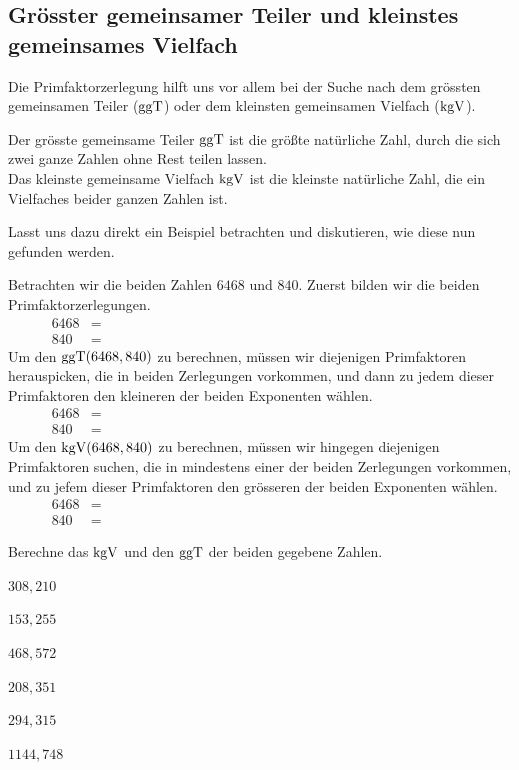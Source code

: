 \documentclass[11pt,oneside]{article}
\begin{document}
\subsection{Grösster gemeinsamer Teiler und kleinstes gemeinsames Vielfach}
    Die Primfaktorzerlegung hilft uns vor allem bei der Suche nach dem grössten gemeinsamen Teiler ($\operatorname{ggT}$) oder dem kleinsten gemeinsamen Vielfach ($\operatorname{kgV}$).
    \begin{definition}
        Der grösste gemeinsame Teiler $\operatorname{ggT}$ ist die größte natürliche Zahl, durch die sich zwei ganze Zahlen ohne Rest teilen lassen.\\
        Das kleinste gemeinsame Vielfach $\operatorname{kgV}$ ist die kleinste natürliche Zahl, die ein Vielfaches beider ganzen Zahlen ist.
    \end{definition}
    Lasst uns dazu direkt ein Beispiel betrachten und diskutieren, wie diese nun gefunden werden.
    \begin{beispiel}
        Betrachten wir die beiden Zahlen $6468$ und $840$. Zuerst bilden wir die beiden Primfaktorzerlegungen.
        \begin{align*}
            6468&=\hspace{11cm}\\
            840&=
        \end{align*}
        Um den $\operatorname{ggT}(6468,840)$ zu berechnen, müssen wir diejenigen Primfaktoren herauspicken, die in beiden Zerlegungen vorkommen, und dann zu jedem dieser Primfaktoren den kleineren der beiden Exponenten wählen.
        \begin{align*}
            6468&=\hspace{11cm}\\
            840&=
        \end{align*}
        Um den $\operatorname{kgV}(6468,840)$ zu berechnen, müssen wir hingegen diejenigen Primfaktoren suchen, die in mindestens einer der beiden Zerlegungen vorkommen, und zu jefem dieser Primfaktoren den grösseren der beiden Exponenten wählen.
        \begin{align*}
            6468&=\hspace{11cm}\\
            840&=
        \end{align*}
    \end{beispiel}
    \begin{aufgabe}
        Berechne das $\operatorname{kgV}$ und den $\operatorname{ggT}$ der beiden gegebene Zahlen.
        \begin{enumcols}[3]
            \item $308,210$
            \item $153,255$
            \item $468,572$
            \item $208,351$
            \item $294,315$
            \item $1144,748$
        \end{enumcols}
    \end{aufgabe}
\end{document}
